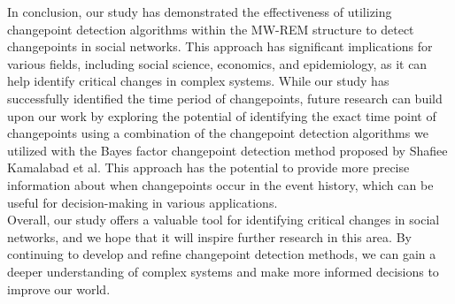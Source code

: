 \documentclass[]{interact}
\theoremstyle{plain}%
\theoremstyle{definition}
\theoremstyle{remark}
\begin{document}
	In conclusion, our study has demonstrated the effectiveness of utilizing changepoint detection algorithms within the MW-REM structure to detect changepoints in social networks. This approach has significant implications for various fields, including social science, economics, and epidemiology, as it can help identify critical changes in complex systems. While our study has successfully identified the time period of changepoints, future research can build upon our work by exploring the potential of identifying the exact time point of changepoints using a combination of the changepoint detection algorithms we utilized with the Bayes factor changepoint detection method proposed by Shafiee Kamalabad et al\cite{kamalabadWhatPointChange}. This approach has the potential to provide more precise information about when changepoints occur in the event history, which can be useful for decision-making in various applications. \\
	
	Overall, our study offers a valuable tool for identifying critical changes in social networks, and we hope that it will inspire further research in this area. By continuing to develop and refine changepoint detection methods, we can gain a deeper understanding of complex systems and make more informed decisions to improve our world. \\
	
	
	\newpage
	
	\nocite{*} %
	
	
	
\end{document}
